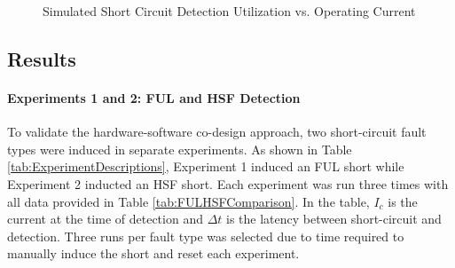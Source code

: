 \begin{figure}
\centering
{}
    \caption{Simulated Short Circuit Detection Utilization vs. Operating Current}
    \label{fig:Simulated Utilization}
\end{figure}

\clearpage \subsection{Results}\label{subsec:results}
\paragraph{Experiments 1 and 2: FUL and HSF Detection}
To validate the hardware-software co-design approach, two short-circuit fault types were induced in separate experiments. As shown in Table \ref{tab:ExperimentDescriptions}, Experiment 1 induced an FUL short while Experiment 2 inducted an HSF short. Each experiment was run three times with all data provided in Table \ref{tab:FULHSFComparison}. In the table, $I_{c}$ is the current at the time of detection and $\Delta t$ is the latency between short-circuit and detection. Three runs per fault type was selected due to time required to manually induce the short and reset each experiment.

